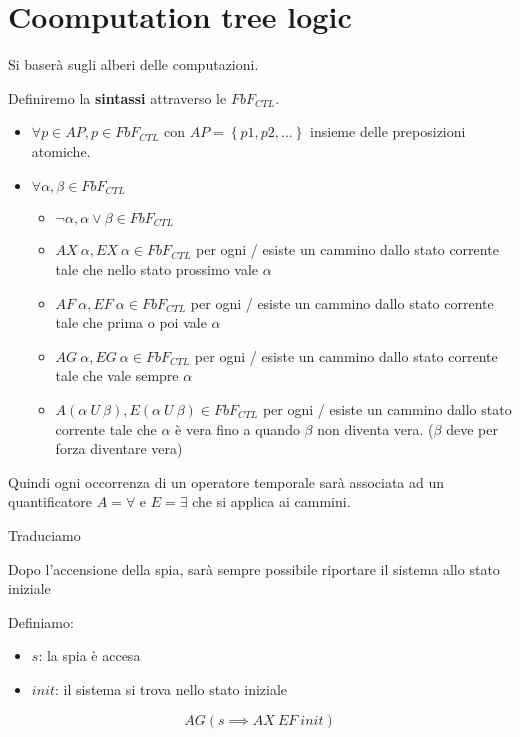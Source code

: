 \section{Coomputation tree logic}
Si baserà sugli alberi delle computazioni.

Definiremo la \textbf{sintassi} attraverso le $FbF_{CTL}$.
\begin{itemize}
    \item $\forall p \in AP, p\in FbF_{CTL}$ con $AP =\left\{p1,p2,\dots\right\}$
    insieme delle preposizioni atomiche.
    \item $\forall \alpha, \beta \in FbF_{CTL}$
    \begin{itemize}
        \item $\lnot\alpha, \alpha \lor \beta \in FbF_{CTL}$ 
        \item $AX \ \alpha, EX \ \alpha \in FbF_{CTL}$ per ogni / esiste un cammino 
        dallo stato corrente tale che nello stato prossimo vale $\alpha$
        \item $AF \ \alpha, EF \ \alpha \in FbF_{CTL}$ per ogni / esiste un cammino 
        dallo stato corrente tale che prima o poi vale $\alpha$
        \item $AG \ \alpha, EG \ \alpha \in FbF_{CTL}$ per ogni / esiste un cammino 
        dallo stato corrente tale che vale sempre $\alpha$
        \item $A(\alpha \ U \ \beta), E(\alpha \ U \ \beta)\in FbF_{CTL}$ per ogni / esiste 
        un cammino dallo stato corrente tale che $\alpha$ è vera fino a quando $\beta$
        non diventa vera. ($\beta$ deve per forza diventare vera)
    \end{itemize}
\end{itemize}

Quindi ogni occorrenza di un operatore temporale sarà associata ad un quantificatore
$A=\forall$ e $E= \exists$ che si applica ai cammini.

\begin{esempio}
    Traduciamo 
    \begin{center}
        Dopo l'accensione della spia, sarà sempre possibile riportare il sistema 
        allo stato iniziale
    \end{center}
    Definiamo:
    \begin{itemize}
        \item $s$: la spia è accesa
        \item $init$: il sistema si trova nello stato iniziale 
    \end{itemize}
    \begin{equation}
        AG(s\implies AX \ EF \ init)
    \end{equation}
\end{esempio}

